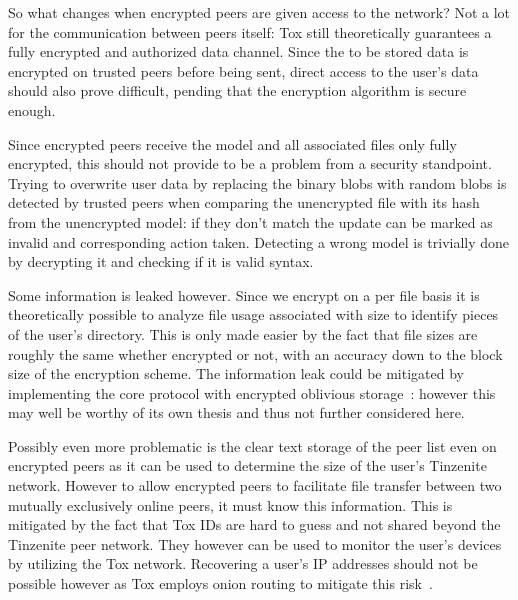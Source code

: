 So what changes when encrypted peers are given access to the network?
Not a lot for the communication between peers itself: Tox still theoretically guarantees a fully encrypted and authorized data channel.
Since the to be stored data is encrypted on trusted peers before being sent, direct access to the user's data should also prove difficult, pending that the encryption algorithm is secure enough.

Since encrypted peers receive the model and all associated files only fully encrypted, this should not provide to be a problem from a security standpoint.
Trying to overwrite user data by replacing the binary blobs with random blobs is detected by trusted peers when comparing the unencrypted file with its hash from the unencrypted model: if they don't match the update can be marked as invalid and corresponding action taken.
Detecting a wrong model is trivially done by decrypting it and checking if it is valid syntax.

Some information is leaked however.
Since we encrypt on a per file basis it is theoretically possible to analyze file usage associated with size to identify pieces of the user's directory.
This is only made easier by the fact that file sizes are roughly the same whether encrypted or not, with an accuracy down to the block size of the encryption scheme.
The information leak could be mitigated by implementing the core protocol with encrypted oblivious storage~\cite{goldreich1987towards}: however this may well be worthy of its own thesis and thus not further considered here.

Possibly even more problematic is the clear text storage of the peer list even on encrypted peers as it can be used to determine the size of the user's Tinzenite network.
However to allow encrypted peers to facilitate file transfer between two mutually exclusively online peers, it must know this information.
This is mitigated by the fact that Tox IDs are hard to guess and not shared beyond the Tinzenite peer network.
They however can be used to monitor the user's devices by utilizing the Tox network.
Recovering a user's IP addresses should not be possible however as Tox employs onion routing to mitigate this risk~\cite{web:site:tox:wiki:onion}.
